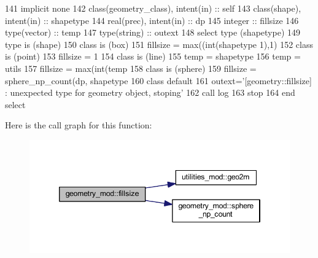 \begin{DoxyCode}
141     \textcolor{keywordtype}{implicit none}
142     \textcolor{keywordtype}{class}(geometry\_class), \textcolor{keywordtype}{intent(in)} :: self
143     \textcolor{keywordtype}{class}(shape), \textcolor{keywordtype}{intent(in)} :: shapetype
144     \textcolor{keywordtype}{real(prec)}, \textcolor{keywordtype}{intent(in)} :: dp
145     \textcolor{keywordtype}{integer} :: fillsize
146     \textcolor{keywordtype}{type}(vector) :: temp
147     \textcolor{keywordtype}{type}(string) :: outext
148     \textcolor{keywordflow}{select type} (shapetype)
149 \textcolor{keywordflow}{    type is} (shape)
150 \textcolor{keywordflow}{    class is} (box)
151         fillsize = max((int(shapetype%
      1),1)
152 \textcolor{keywordflow}{    class is} (point)
153         fillsize = 1
154 \textcolor{keywordflow}{    class is} (line)
155         temp = shapetype%
156         temp = utils%
157         fillsize = max(int(temp%
158 \textcolor{keywordflow}{    class is} (sphere)
159         fillsize = sphere\_np\_count(dp, shapetype%
160 \textcolor{keywordflow}{        class default}
161         outext=\textcolor{stringliteral}{'[geometry::fillsize] : unexpected type for geometry object, stoping'}
162         \textcolor{keyword}{call }log%
163         stop
164 \textcolor{keywordflow}{    end select}
\end{DoxyCode}
Here is the call graph for this function\+:\nopagebreak
\begin{figure}[H]
\begin{center}
\leavevmode
\includegraphics[width=346pt]{namespacegeometry__mod_ad790edd694561b33dad20cfa3a14e8f2_cgraph}
\end{center}
\end{figure}
\mbox{\label{namespacegeometry__mod_a4a38edbff02aa0ff5f16a16c39bf778e}} 
